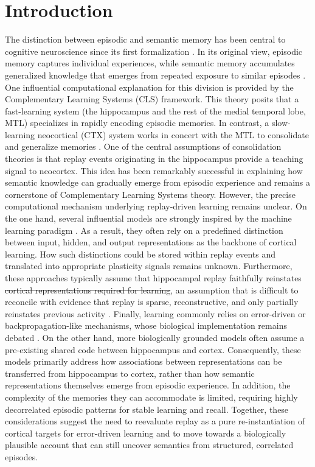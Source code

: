 \documentclass{article}
\providecommand{\DIFaddtex}[1]{{\protect\color{blue}\uwave{#1}}} %
\providecommand{\DIFdeltex}[1]{{\protect\color{red}\sout{#1}}}                      %
\providecommand{\DIFaddbegin}{} %
\providecommand{\DIFaddend}{} %
\providecommand{\DIFdelbegin}{} %
\providecommand{\DIFdelend}{} %
\providecommand{\DIFadd}[1]{\texorpdfstring{\DIFaddtex{#1}}{#1}} %
\providecommand{\DIFdel}[1]{\texorpdfstring{\DIFdeltex{#1}}{}} %
\begin{document}
\section*{Introduction}
The distinction between episodic and semantic memory has been central to cognitive neuroscience since its first formalization . In its original view, episodic memory captures individual experiences, while semantic memory accumulates generalized knowledge that emerges from repeated exposure to similar episodes . One influential computational explanation for this division is provided by the Complementary Learning Systems (CLS) framework. This theory posits that a fast-learning system (the hippocampus and the rest of the medial temporal lobe, MTL) specializes in rapidly encoding episodic memories. In contrast, a slow-learning neocortical (CTX) system works in concert with the MTL to consolidate and generalize memories .
\newline\newline
One of the central assumptions of consolidation theories is that replay events originating in the hippocampus provide a teaching signal to neocortex. This idea has been remarkably successful in explaining how semantic knowledge can gradually emerge from episodic experience and remains a cornerstone of Complementary Learning Systems theory. However, the precise computational mechanism underlying replay-driven learning remains unclear. On the one hand, several influential models are strongly inspired by the machine learning paradigm . As a result, they often rely on a predefined distinction between input, hidden, and output representations as the backbone of cortical learning. How such distinctions could be stored within replay events and translated into appropriate plasticity signals remains unknown. Furthermore, these approaches typically assume that hippocampal replay faithfully reinstates \DIFdelbegin \DIFdel{cortical representations required for learning}\DIFdelend \DIFaddbegin \DIFadd{the entirety of episodic neural activity during encoding}\DIFaddend , an assumption that is difficult to reconcile with evidence that replay is sparse, reconstructive, and only partially reinstates previous activity . Finally, learning commonly relies on error-driven or backpropagation-like mechanisms, whose biological implementation remains debated . On the other hand, more biologically grounded models  often assume a pre-existing shared code between hippocampus and cortex. Consequently, these models primarily address how associations between representations can be transferred from hippocampus to cortex, rather than how semantic representations themselves emerge from episodic experience. In addition, the complexity of the memories they can accommodate is limited, requiring highly decorrelated episodic patterns for stable learning and recall. Together, these considerations suggest the need to reevaluate replay as a pure re-instantiation of cortical targets for error-driven learning and to move towards a biologically plausible account that can still uncover semantics from structured, correlated episodes.
\end{document}
